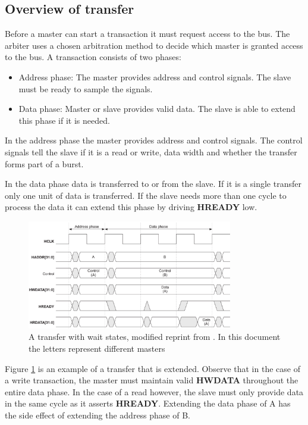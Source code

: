 \subsection{Overview of transfer}
Before a master can start a transaction it must request access to the bus. The arbiter uses a chosen arbitration method to decide which master is granted access
to the bus. A transaction consists of two phases: \\
\begin{itemize}
 \item Address phase: The master provides address and control signals. The slave must be ready to sample the signals. 
 \item Data phase: Master or slave provides valid data. The slave is able to extend this phase if it is needed. 
\end{itemize}

In the address phase the master provides address and control signals. The control signals tell the slave if it is a read or write, data width and whether the
transfer forms part of a burst. \par
In the data phase data is transferred to or from the slave. If it is a single transfer only one unit of data is transferred. If the slave needs more than
one cycle to process the data it can extend this phase by driving \textbf{HREADY} low. 

\begin{figure}[hbt]
    \begin{center}
        \includegraphics[width=0.8\textwidth]{figs/AHB/transfer.png}
    \end{center}
    \caption{A transfer with wait states, modified reprint from \cite{amba}. In this document the letters represent different masters}
    \label{fig:transfer}
\end{figure}

Figure \ref{fig:transfer} is an example of a transfer that is extended. Observe that in the case of a write transaction, the master must maintain valid \textbf{HWDATA} throughout the entire data phase. In the case of a read however, the slave must only provide data in the same cycle as it asserts \textbf{HREADY}. Extending the data phase of A has the side effect of extending the address phase of B.  


